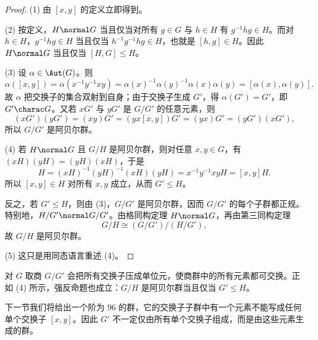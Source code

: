 \begin{proof}
(1) 由 $[x,y]$ 的定义立即得到。

(2) 按定义，$H\normal G$ 当且仅当对所有 $g\in G$ 与 $h\in H$ 有 $g^{-1}hg\in H$。而对 $h\in H$，$g^{-1}hg\in H$ 当且仅当 $h^{-1}g^{-1}hg\in H$，也就是 $[h,g]\in H$。因此 $H\normal G$ 当且仅当 $[H,G]\leq H$。

(3) 设 $\alpha\in\Aut(G)$。则
\[
  \alpha([x,y])=\alpha(x^{-1}y^{-1}xy)=\alpha(x)^{-1}\alpha(y)^{-1}\alpha(x)\alpha(y)=[\alpha(x),\alpha(y)].
\]
故 $\alpha$ 把交换子的集合双射到自身；由于交换子生成 $G'$，得 $\alpha(G')=G'$，即 $G'\charac G$。又若 $xG'$ 与 $yG'$ 是 $G/G'$ 的任意元素，则
\[
  (xG')(yG')=(xy)G'=(yx[x,y])G'=(yx)G'=(yG')(xG'),
\]
所以 $G/G'$ 是阿贝尔群。

(4) 若 $H\normal G$ 且 $G/H$ 是阿贝尔群，则对任意 $x,y\in G$，有 $(xH)(yH)=(yH)(xH)$，于是
\[
  H=(xH)^{-1}(yH)^{-1}(xH)(yH)=x^{-1}y^{-1}xyH=[x,y]H.
\]
所以 $[x,y]\in H$ 对所有 $x,y$ 成立，从而 $G'\leq H$。

反之，若 $G'\leq H$，则由 (3)，$G/G'$ 是阿贝尔群，因而 $G/G'$ 的每个子群都正规。特别地，$H/G'\normal G/G'$。由格同构定理 $H\normal G$，再由第三同构定理
\[
  G/H\cong (G/G')/(H/G'),
\]
故 $G/H$ 是阿贝尔群。

(5) 这只是用同态语言重述 (4)。
\end{proof}

对 $G$ 取商 $G/G'$ 会把所有交换子压成单位元，使商群中的所有元素都可交换。正如 (4) 所示，强反命题也成立：$G/H$ 是阿贝尔群当且仅当 $G'\leq H$。

下一节我们将给出一个阶为 $96$ 的群，它的交换子子群中有一个元素不能写成任何单个交换子 $[x,y]$。因此 $G'$ 不一定仅由所有单个交换子组成，而是由这些元素生成的群。

